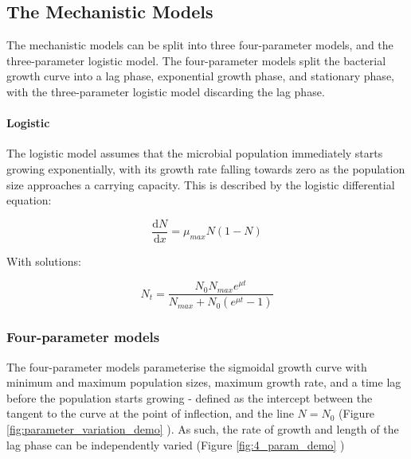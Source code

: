 \documentclass[11pt, a4paper]{article}
\begin{document}
\begin{linenumbers}
\subsection{The Mechanistic Models}

The mechanistic models can be split into three four-parameter models, and the three-parameter logistic model. The four-parameter models split the bacterial growth curve into a lag phase, exponential growth phase, and stationary phase, with the three-parameter logistic model discarding the lag phase.

\paragraph{Logistic}
The logistic model \cite{logisticVel1, logisticVel2} assumes that the microbial population immediately starts growing exponentially, with its growth rate falling towards zero as the population size approaches a carrying capacity. This is described by the logistic differential equation:

\[ \frac{\mathrm d N}{\mathrm d x} =  \mu_{max}N(1-N)  \]

With solutions:

\[ N_t =   \frac{N_0  N_{max} e^{\mu t}}{N_{max} + N_0 (e^{\mu t} - 1)} \]


\subsubsection{Four-parameter models}

The four-parameter models parameterise the sigmoidal growth curve with minimum and maximum population sizes, maximum growth rate, and a time lag before the population starts growing - defined as the intercept between the tangent to the curve at the point of inflection, and the line $N = N_0$ (Figure \ref{fig:parameter_variation_demo} ). As such, the rate of growth and length of the lag phase can be independently varied (Figure \ref{fig:4_param_demo} )


\end{linenumbers}
\end{document}
